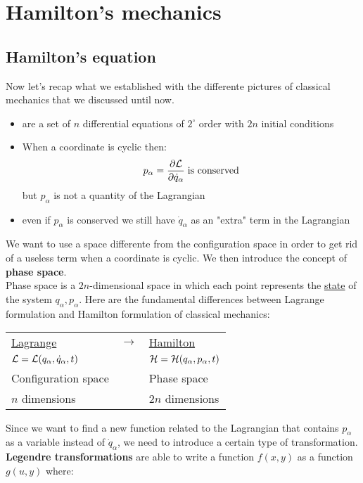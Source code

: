 \chapter{Hamilton's mechanics}
\section{Hamilton's equation}
Now let's recap what we established with the differente pictures of classical mechanics that we discussed until now.
\begin{itemize}
    \item \eleref\;are a set of $n$ differential equations of $2^\circ$ order with $2n$ initial conditions
    \item When a coordinate is cyclic then: \begin{equation}
        p_{\alpha} = \dfrac{\partial \mathcal{L}}{\partial \dot{q}_{\alpha}}\;\text{is conserved}
    \end{equation}
    but $p_{\alpha}$ is not a quantity of the Lagrangian
    \item even if $p_\alpha$ is conserved we still have $\dot{q}_{\alpha}$ as an "extra" term in the Lagrangian
\end{itemize}
We want to use a space differente from the configuration space in order to get rid of a useless term when a coordinate is cyclic. We then introduce the concept of \textbf{phase space}.\\
Phase space is a $2n$-dimensional space in which each point represents the \underline{state} of the system ${q_{\alpha},p_{\alpha}}$.
Here are the fundamental differences between Lagrange formulation and Hamilton formulation of classical mechanics:
\begin{table}[H]
    \centering
    \begin{tabular}{lll}
        \underline{Lagrange} & $\longrightarrow$ &\underline{Hamilton}\\
        $\mathcal{L}=\mathcal{L}(q_{\alpha},\dot{q}_{\alpha},t)$ & &$\mathcal{H}=\mathcal{H}(q_{\alpha},p_{\alpha},t)$\\
        Configuration space & &Phase space\\
        $n$ dimensions & &$2n$ dimensions
    \end{tabular}
\end{table}
Since we want to find a new function related to the Lagrangian that contains $p_{\alpha}$ as a variable instead of $\dot{q}_{\alpha}$, we need to introduce a certain type of transformation.\\
\textbf{Legendre transformations} are able to write a function $f(x,y)$ as a function $g(u,y)$ where:
